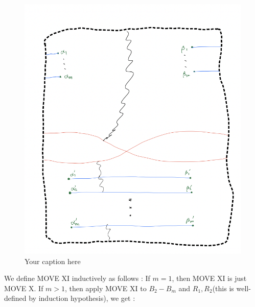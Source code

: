 \begin{figure}[H] %
    \centering
    \includegraphics[width=\linewidth]{diagrams/definition11/2.png} %
    \caption{Your caption here}
    \label{fig:your-label}
\end{figure}

We define MOVE \RN{11} inductively as follows : If $m=1$, then MOVE \RN{11} is just MOVE \RN{10}. If $m>1$, then apply MOVE \RN{11} to $B_2 - B_m$ and $R_1, R_2$(this is well-defined by induction hypothesis), we get :

